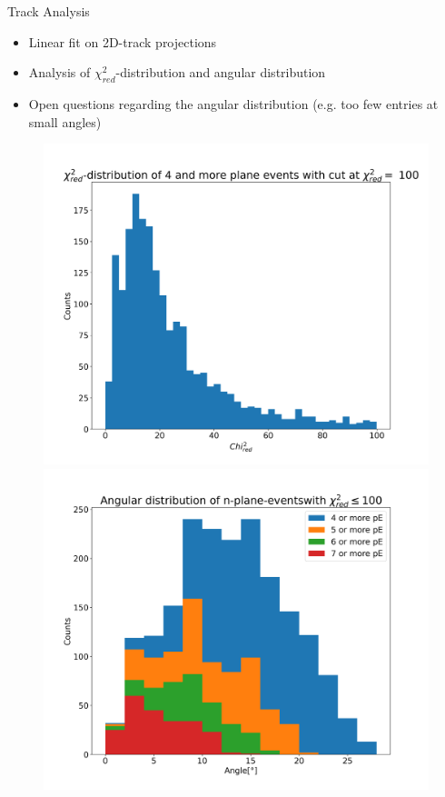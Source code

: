 \begin{frame}{Track Analysis}
  \begin{itemize}
    \item Linear fit on 2D-track projections
    \item Analysis of $\chi^2_{red}$-distribution and angular distribution
    \item Open questions regarding the angular distribution (e.g. too few entries at small angles)

  \end{itemize}
  \begin{figure}[H]
    \centering
    \includegraphics[width=.49\textwidth]{track_chi}
    \includegraphics[width=.49\textwidth]{track_angle}
  \end{figure}
\end{frame}



